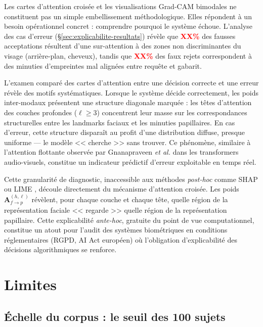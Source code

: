 \documentclass[12pt,a4paper]{report}
\begin{document}
Les cartes d'attention crois\'{e}e et les visualisations Grad-CAM bimodales ne constituent pas un simple embellissement m\'{e}thodologique. Elles r\'{e}pondent \`{a} un besoin op\'{e}rationnel concret : comprendre pourquoi le syst\`{e}me \'{e}choue. L'analyse des cas d'erreur (\S\ref{sec:explicabilite-resultats}) r\'{e}v\`{e}le que \textcolor{red}{\textbf{XX\%}} des fausses acceptations r\'{e}sultent d'une sur-attention \`{a} des zones non discriminantes du visage (arri\`{e}re-plan, cheveux), tandis que \textcolor{red}{\textbf{XX\%}} des faux rejets correspondent \`{a} des minuties d'empreintes mal align\'{e}es entre requ\^{e}te et gabarit.

L'examen compar\'{e} des cartes d'attention entre une d\'{e}cision correcte et une erreur r\'{e}v\`{e}le des motifs syst\'{e}matiques. Lorsque le syst\`{e}me d\'{e}cide correctement, les poids inter-modaux pr\'{e}sentent une structure diagonale marqu\'{e}e : les t\^{e}tes d'attention des couches profondes ($\ell \geq 3$) concentrent leur masse sur les correspondances structurelles entre les landmarks faciaux et les minuties papillaires. En cas d'erreur, cette structure dispara\^{i}t au profit d'une distribution diffuse, presque uniforme --- le mod\`{e}le << cherche >> sans trouver. Ce ph\'{e}nom\`{e}ne, similaire \`{a} l'attention flottante observ\'{e}e par Gnanapraveen \emph{et al.} \cite{gnanapraveen2024cross} dans les transformers audio-visuels, constitue un indicateur pr\'{e}dictif d'erreur exploitable en temps r\'{e}el.

Cette granularit\'{e} de diagnostic, inaccessible aux m\'{e}thodes \emph{post-hoc} comme SHAP ou LIME \cite{selvarani2025explainability}, d\'{e}coule directement du m\'{e}canisme d'attention crois\'{e}e. Les poids $\mathbf{A}_{f \rightarrow p}^{(h,\ell)}$ r\'{e}v\`{e}lent, pour chaque couche et chaque t\^{e}te, quelle r\'{e}gion de la repr\'{e}sentation faciale << regarde >> quelle r\'{e}gion de la repr\'{e}sentation papillaire. Cette explicabilit\'{e} \emph{ante-hoc}, gratuite du point de vue computationnel, constitue un atout pour l'audit des syst\`{e}mes biom\'{e}triques en conditions r\'{e}glementaires (RGPD, AI Act europ\'{e}en) o\`{u} l'obligation d'explicabilit\'{e} des d\'{e}cisions algorithmiques se renforce.

\section{Limites}
\label{sec:limites}

\subsection{\'{E}chelle du corpus : le seuil des 100 sujets}
\end{document}
